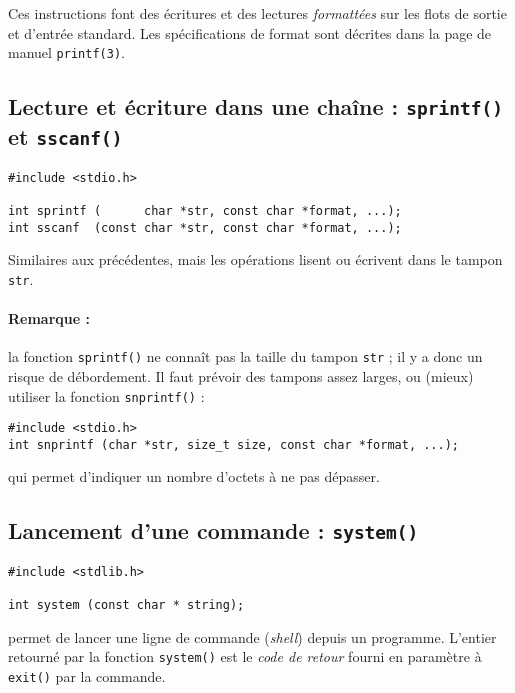 Ces instructions font des écritures et des lectures \emph{formattées}
sur les flots de sortie et d'entrée standard.  Les spécifications de
format sont décrites dans la page de manuel \texttt{printf(3)}.



\subsection{Lecture et écriture dans une chaîne :  \texttt{sprintf()} et \texttt{sscanf()}}

    \extrait
\begin{lstlisting}
#include <stdio.h>
  
int sprintf (      char *str, const char *format, ...);     
int sscanf  (const char *str, const char *format, ...); 
\end{lstlisting}


Similaires aux précédentes, mais les opérations lisent ou écrivent
dans le tampon \texttt{str}. 

\paragraph*{Remarque : } la fonction \texttt{sprintf()} ne connaît pas la
taille du tampon \texttt{str} ; il y a donc un risque de
débordement. Il faut prévoir des tampons assez larges, ou (mieux)
utiliser la fonction \texttt{snprintf()} :

\extrait
\begin{lstlisting}
#include <stdio.h>
int snprintf (char *str, size_t size, const char *format, ...);     
\end{lstlisting}

qui permet d'indiquer un nombre d'octets à ne pas dépasser.


\subsection{Lancement d'une commande : \texttt{system()}}

\extrait
\begin{lstlisting}
#include <stdlib.h>

int system (const char * string);
\end{lstlisting}
permet de lancer une ligne de commande (\emph{shell}) depuis un
programme.  L'entier retourné par la fonction \texttt{system()} est le
\emph{code de retour} fourni en paramètre à \texttt{exit()} par la
commande.


